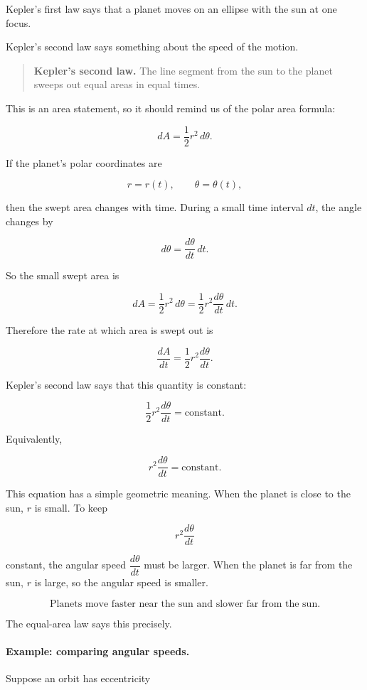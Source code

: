 Kepler's first law says that a planet moves on an ellipse with the sun at one focus.

Kepler's second law says something about the speed of the motion.

\begin{quote}
\textbf{Kepler's second law.}
The line segment from the sun to the planet sweeps out equal areas in equal times.
\end{quote}

This is an area statement, so it should remind us of the polar area formula:

\[
dA=\frac12 r^2\,d\theta.
\]

If the planet's polar coordinates are

\[
r=r(t),
\qquad
\theta=\theta(t),
\]

then the swept area changes with time.  During a small time interval \(dt\), the angle
changes by

\[
d\theta=\frac{d\theta}{dt}\,dt.
\]

So the small swept area is

\[
dA
=
\frac12 r^2\,d\theta
=
\frac12 r^2\frac{d\theta}{dt}\,dt.
\]

Therefore the rate at which area is swept out is

\[
\boxed{
\frac{dA}{dt}
=
\frac12 r^2\frac{d\theta}{dt}.
}
\]

Kepler's second law says that this quantity is constant:

\[
\boxed{
\frac12 r^2\frac{d\theta}{dt}=\text{constant}.
}
\]

Equivalently,

\[
\boxed{
r^2\frac{d\theta}{dt}=\text{constant}.
}
\]

This equation has a simple geometric meaning.  When the planet is close to the sun,
\(r\) is small.  To keep

\[
r^2\frac{d\theta}{dt}
\]

constant, the angular speed \(\dfrac{d\theta}{dt}\) must be larger.  When the planet is
far from the sun, \(r\) is large, so the angular speed is smaller.

\[
\boxed{
\text{Planets move faster near the sun and slower far from the sun.}
}
\]

The equal-area law says this precisely.

\paragraph{Example: comparing angular speeds.}
Suppose an orbit has eccentricity


